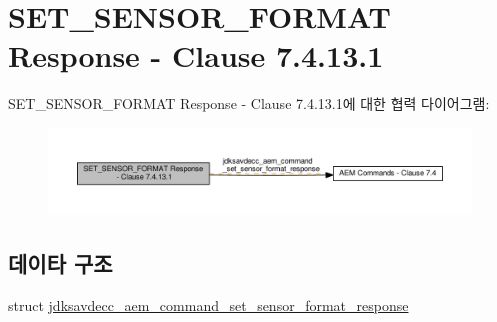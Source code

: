 \hypertarget{group__command__set__sensor__format__response}{}\section{S\+E\+T\+\_\+\+S\+E\+N\+S\+O\+R\+\_\+\+F\+O\+R\+M\+AT Response -\/ Clause 7.4.13.1}
\label{group__command__set__sensor__format__response}
S\+E\+T\+\_\+\+S\+E\+N\+S\+O\+R\+\_\+\+F\+O\+R\+M\+AT Response -\/ Clause 7.4.13.1에 대한 협력 다이어그램\+:
\nopagebreak
\begin{figure}[H]
\begin{center}
\leavevmode
\includegraphics[width=350pt]{group__command__set__sensor__format__response}
\end{center}
\end{figure}
\subsection*{데이타 구조}
\begin{DoxyCompactItemize}
\item 
struct \hyperlink{structjdksavdecc__aem__command__set__sensor__format__response}{jdksavdecc\+\_\+aem\+\_\+command\+\_\+set\+\_\+sensor\+\_\+format\+\_\+response}
\end{DoxyCompactItemize}
